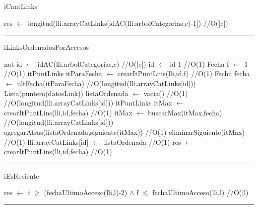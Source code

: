 \begin{algorithm}[H]
\caption{iCantLinks}
\begin{algorithmic}[1]
\state res $\gets$ longitud(lli.arrayCatLinks[idAC(lli.arbolCategorias,c)-1]) \hfill //O(|c|)
\EndFunction 
\end{algorithmic}
\hrule
{}
\end{algorithm}

\begin{algorithm}[H]
\caption{iLinksOrdenadosPorAccesos}
\begin{algorithmic}[1]
\state nat id $\gets$ idAC(lli.arbolCategorias,c) \hfill//O(|c|)
\state id $\gets$ id-1 \hfill //O(1)
\state Fecha f $\gets$ 1 \hfill //O(1)
\state itPuntLinks itParaFecha $\gets$ crearItPuntLins(lli,id,f) \hfill //O(1)
\state Fecha fecha $\gets$ ultFecha(itParaFecha) \hfill //O(longitud(lli.arrayCatLinks[id]))
\state Lista(puntero(datosLink)) listaOrdenada $\gets$ vacia() \hfill//O(1)
\state\hfill //O(longitud(lli.arrayCatLinks[id]))
\state itPuntLinks itMax $\gets$ crearItPuntLins(lli,id,fecha) \hfill //O(1)
\state itMax $\gets$ buscarMax(itMax,fecha) \hfill //O(longitud(lli.arrayCatLinks[id]))
\state agregarAtras(listaOrdenada,siguiente(itMax)) \hfill //O(1)
\state eliminarSiguiente(itMax) \hfill //O(1)
\endwhile
\state lli.arrayCatLinks[id] $\gets$ listaOrdenada \hfill //O(1)
\endif
\state res $\gets$ crearItPuntLins(lli,id,fecha) \hfill //O(1)
\EndFunction 
\end{algorithmic}
\hrule
{}
\end{algorithm}

\begin{algorithm}[H]
\caption{iEsReciente}
\begin{algorithmic}[1]
\state res $\gets$ f $\geq$ (fechaUltimoAcceso(lli,l)-2) $\land$ f $\leq$ fechaUltimoAcceso(lli,l) \hfill//O(|l)
\EndFunction 
\end{algorithmic}
\hrule
{}
\end{algorithm}

